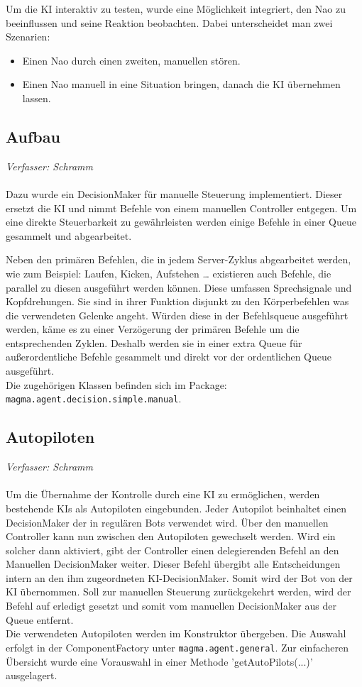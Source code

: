 Um die KI interaktiv zu testen, wurde eine Möglichkeit integriert, den Nao zu beeinflussen und seine Reaktion beobachten. Dabei unterscheidet man zwei Szenarien:
\begin{itemize}
\item Einen Nao durch einen zweiten, manuellen stören.
\item Einen Nao manuell in eine Situation bringen, danach die KI übernehmen lassen.
\end{itemize}

\subsection{Aufbau}
\textit{Verfasser: Schramm}\\
\\
Dazu wurde ein DecisionMaker für manuelle Steuerung implementiert. Dieser ersetzt die KI und nimmt Befehle von einem manuellen Controller entgegen.
Um eine direkte Steuerbarkeit zu gewährleisten werden einige Befehle in einer Queue gesammelt und abgearbeitet.

Neben den primären Befehlen, die in jedem Server-Zyklus abgearbeitet werden, wie zum Beispiel: Laufen, Kicken, Aufstehen … existieren auch Befehle, die parallel zu diesen ausgeführt werden können. Diese umfassen Sprechsignale und Kopfdrehungen. Sie sind in ihrer Funktion disjunkt zu den Körperbefehlen was die verwendeten Gelenke angeht. Würden diese in der Befehlsqueue ausgeführt werden, käme es zu einer Verzögerung der primären Befehle um die entsprechenden Zyklen. Deshalb werden sie in einer extra Queue für außerordentliche Befehle gesammelt und direkt vor der ordentlichen Queue ausgeführt.\\
Die zugehörigen Klassen befinden sich im Package:\\ \texttt{magma.agent.decision.simple.manual}.

\subsection{Autopiloten}
\textit{Verfasser: Schramm}\\
\\
Um die Übernahme der Kontrolle durch eine KI zu ermöglichen, werden bestehende KIs als Autopiloten eingebunden. Jeder Autopilot beinhaltet einen DecisionMaker der in regulären Bots verwendet wird. Über den manuellen Controller kann nun zwischen den Autopiloten gewechselt werden. Wird ein solcher dann aktiviert, gibt der Controller einen delegierenden Befehl an den Manuellen DecisionMaker weiter. Dieser Befehl übergibt alle Entscheidungen intern an den ihm zugeordneten KI-DecisionMaker. Somit wird der Bot von der KI übernommen. Soll zur manuellen Steuerung zurückgekehrt werden, wird der Befehl auf erledigt gesetzt und somit vom manuellen DecisionMaker aus der Queue entfernt.\\
Die verwendeten Autopiloten werden im Konstruktor übergeben. Die Auswahl erfolgt in der ComponentFactory unter \texttt{magma.agent.general}. Zur einfacheren Übersicht wurde eine Vorauswahl in einer Methode 'getAutoPilots(...)' ausgelagert.

